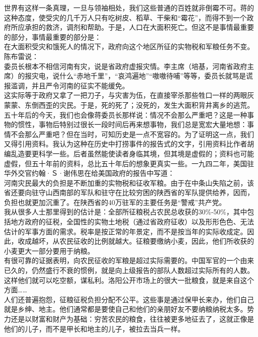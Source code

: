世界有这样一条真理，一旦与领袖相处，我们这些普通的百姓就非倒霉不可。蒋的这种态度，使受灾的几千万人只有吃树皮、稻草、干柴和“霉花”，而得不到一个政府所应承担的救济，调剂和帮助。于是，人口在大面积死亡。但这不是事情最重要的部分，事情最重要的部分是：\\

在大面积受灾和饿死人的情况下，政府向这个地区所征的实物税和军粮任务不变。\\

陈布雷说：\\

委员长根本不相信河南有灾，说是省政府虚报灾情。李主席（培基，河南省政府主席）的报灾电，说什么“赤地千里”，“哀鸿遍地”“嗷嗷待哺”等等，委员长就骂是谎报滥调，并且严令河南的征实不能缓免。\\

这实际等于政府又拿了一把刀子，与灾害为伍，在直接宰杀那些牲口一样的两眼灰蒙蒙、东倒西歪的灾民。于是，死的死了；没死的，发生大面积背井离乡的逃荒。五十年后的今天，我们也会像蒋委员长那样说：情况不会那么严重吧？这是一种事物的惯性，事物后特别过很长一段时间后再来想事物，我们总是宽宏大量地想：事情不会那么严重吧？但在当时，可知历史是一点不宽容的。为了证明这一点，我们又得引用资料。我认为这种在历史中打捞事件的报告式的文字，引用资料比作者胡编乱造要更科学一些。后者虽然能使读者身临其境，但其境是虚假的；资料也可能虚假，但五十年前的资料，总比五十年后的想象更真实一些。一九四二年，美国驻华外交官约翰·Ｓ·谢伟思在给美国政府的报告中写道：\\

河南灾民最大的负担是不断加重的实物税和征收军粮。由于在中条山失陷之前，该省还要向驻守山西南部的军队和驻守在比较穷困的陕西省的军队提供给养，因而，负担也就更加沉重了。在陕西省的40万驻军的主要任务是“警戒”共产党。\\

我从很多人士那里得到的估计是：全部所征粮税占农民总收获的30\%-50\%，其中包括地方政府的征税，全国性的实物土地税（通过省政府征收）以及形形色色、无法估计的军事方面的需求。税率是按正常的年景定，而不是按当年的实际收成定。因此，收成越坏，从农民征收的比例就越大。征粮要缴纳小麦，因此，他们所收获的小麦更大一部分要用于纳粮。\\

有很可靠的证据表明，向农民征收的军粮是超过实际需要的。中国军官的一个由来已久的，仍然盛行不衰的惯例，就是向上级报告的部队人数超过实际所有的人数。这样他们就可以吃空额，谋私利。洛阳公开市场上的很大一批粮食，就是来自这个方面……\\

人们还普遍抱怨，征粮征税负担分配不公平。这些事是通过保甲长来办，他们自己就是乡绅、地主。他们通常都是要使自己和他们的亲朋好友不要纳粮纳税太多。势力还是以财富和财产为基础：穷苦农民的粮食，往往被更多地征去了，这就正像是他们的儿子，而不是甲长和地主的儿子，被拉去当兵一样。\\

